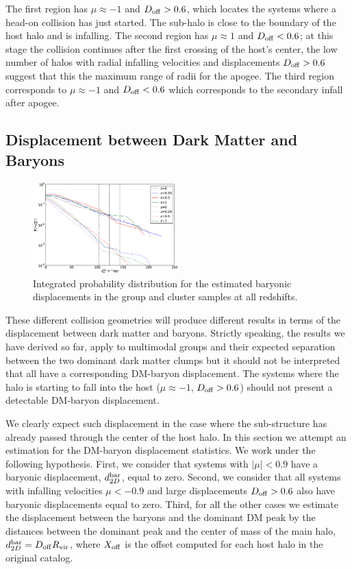 \documentclass{emulateapj}
\begin{document}
The first region has $\mu\approx-1$ and $D_{\rm off}>0.6$, which
locates the systems where a head-on collision has just started. The
sub-halo is close to the boundary of the host halo and is
infalling. The second region has $\mu\approx 1$ and $D_{\rm off}<0.6$;
at this stage the collision continues after the first crossing of the
host's center, the low number of halos with radial infalling velocities
and displacements $D_{\rm off}>0.6$ suggest that this the maximum
range of radii for the apogee.  The third region corresponds to
$\mu\approx-1$ and $D_{\rm off}<0.6$ which corresponds to the
secondary infall after apogee. 



\subsection{Displacement between Dark Matter and Baryons}
\label{sec:baryonic_displacements}

\begin{figure}
\begin{center}
\includegraphics[width=0.5\textwidth]{Figures_eps/figure_7.eps}
\end{center}
\caption{Integrated probability distribution for the estimated
  baryonic displacements in the group and cluster samples at all redshifts.}
\label{fig:baryonic_displacements}
\end{figure}

These different collision geometries will produce different results in
terms of the displacement between dark matter and baryons. Strictly
speaking, the results we have derived so far, apply to multimodal groups and their
expected separation between the two dominant dark matter clumps but it
should not be interpreted that all have a corresponding DM-baryon
displacement. The systems where the halo is starting to fall into the
host ($\mu\approx-1$, $D_{\rm off}>0.6$) should not present a
detectable DM-baryon displacement. 


We clearly expect such displacement in the case where the
sub-structure has already passed through the center of the host
halo. In this section we attempt an estimation for the DM-baryon
displacement statistics. We work under the following
hypothesis. First, we consider that systems with $|\mu|<0.9$ have a
baryonic displacement, $d_{2D}^{\rm bar}$, equal to zero. Second, we
consider that all systems with infalling velocities $\mu<-0.9$ and
large displacements $D_{\rm off}>0.6$ also have baryonic displacements
equal to zero. Third, for all the other cases we estimate the
displacement between the baryons and the dominant DM peak by the
distances between the dominant peak and the center of mass of the main
halo, $d_{2D}^{\rm bar}=D_{\rm off} R_{\rm vir}$, where $X_{\rm off}$
is the offset computed for each host halo in the original catalog.
\end{document}
